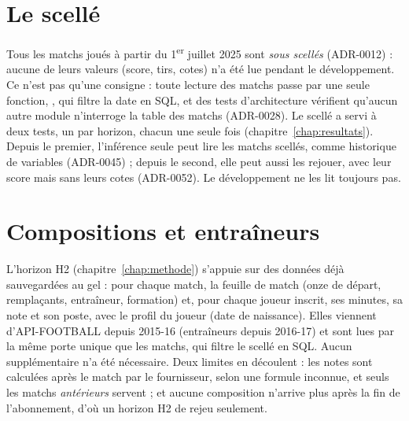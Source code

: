 \section{Le scellé}

Tous les matchs joués à partir du 1\textsuperscript{er} juillet 2025 sont \emph{sous scellés}
(ADR-0012) : aucune de leurs valeurs (score, tirs, cotes) n'a été lue pendant le développement. Ce
n'est pas qu'une consigne : toute lecture des matchs passe par une seule fonction,
, qui filtre la date en SQL, et des tests d'architecture vérifient
qu'aucun autre module n'interroge la table des matchs (ADR-0028). Le scellé a servi à deux tests, un par
horizon, chacun une seule fois (chapitre~\ref{chap:resultats}). Depuis le premier, l'inférence seule peut
lire les matchs scellés, comme historique de variables (ADR-0045) ; depuis le second, elle peut aussi les
rejouer, avec leur score mais sans leurs cotes (ADR-0052). Le développement ne les lit toujours pas.

\section{Compositions et entraîneurs}

L'horizon H2 (chapitre~\ref{chap:methode}) s'appuie sur des données déjà sauvegardées au gel : pour chaque
match, la feuille de match (onze de départ, remplaçants, entraîneur, formation) et, pour chaque joueur
inscrit, ses minutes, sa note et son poste, avec le profil du joueur (date de naissance). Elles
viennent d'API-FOOTBALL depuis 2015-16 (entraîneurs depuis 2016-17) et sont lues par la même porte unique
que les matchs, qui filtre le scellé en SQL. Aucun  supplémentaire n'a été nécessaire. Deux
limites en découlent : les notes sont calculées après le match par le fournisseur, selon une formule
inconnue, et seuls les matchs \emph{antérieurs} servent ; et aucune composition n'arrive plus après la fin
de l'abonnement, d'où un horizon H2 de rejeu seulement.
